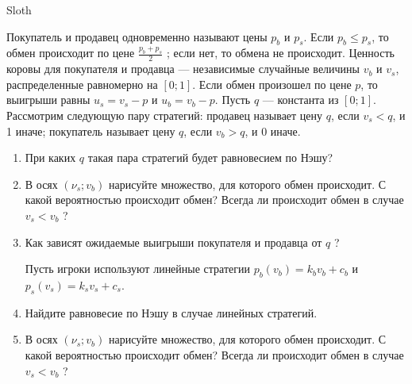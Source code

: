 \begin{problem} \par
\begin{source}Sloth \end{source}
Покупатель и продавец одновременно называют цены  $p_{b} $  и  $p_{s} $. Если  $p_{b} \le p_{s} $, то обмен происходит по цене  $\frac{p_{b} +p_{s} }{2} $ ; если нет, то обмена не происходит. Ценность коровы для покупателя и продавца --- независимые случайные величины  $v_{b} $  и  $v_{s} $, распределенные равномерно на  $\left[0;1\right]$. Если обмен произошел по цене  $p$, то выигрыши равны  $u_{s} =v_{s} -p$  и  $u_{b} =v_{b} -p$.
Пусть  $q$  --- константа из  $\left[0;1\right]$. Рассмотрим следующую пару стратегий: продавец называет цену  $q$, если  $v_{s} <q$, и 1 иначе; покупатель называет цену  $q$, если  $v_{b} >q$, и 0 иначе. \par
\begin{enumerate}
\item	При каких  $q$  такая пара стратегий будет равновесием по Нэшу? \par
\item 	В осях  $\left(\nu _{s} ;v_{b} \right)$  нарисуйте множество, для которого обмен происходит. С какой вероятностью происходит обмен? Всегда ли происходит обмен в случае  $v_{s} <v_{b} $ ? \par
\item 	Как зависят ожидаемые выигрыши покупателя и продавца от  $q$ ?\par
Пусть игроки используют линейные стратегии  $p_{b} \left(v_{b} \right)=k_{b} v_{b} +c_{b} $  и  $p_{s} \left(v_{s} \right)=k_{s} v_{s} +c_{s} $.\par
\item 	Найдите равновесие по Нэшу в случае линейных стратегий. \par
\item 	В осях  $\left(\nu _{s} ;v_{b} \right)$  нарисуйте множество, для которого обмен происходит. С какой вероятностью происходит обмен? Всегда ли происходит обмен в случае  $v_{s} <v_{b} $ ?
\end{enumerate}


\begin{sol}

\end{sol}
\end{problem}



